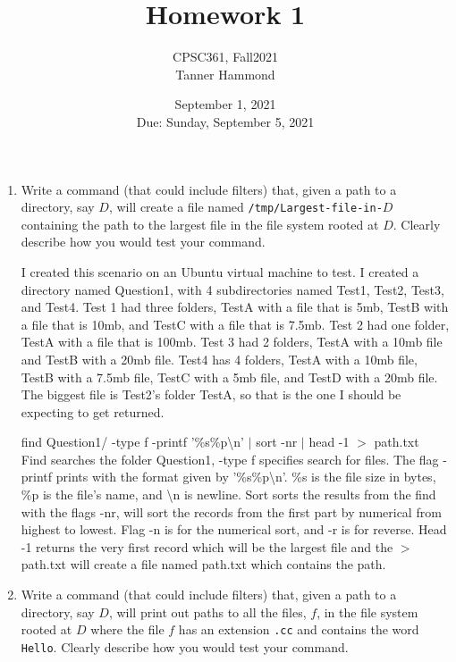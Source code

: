 \documentclass{article}
\title{Homework 1}
\author{CPSC361, Fall2021\\
        Tanner Hammond}
\date{September 1, 2021\\
Due: Sunday, September 5, 2021}
\begin{document}
\maketitle %

\begin{enumerate}

\item Write a command (that could include filters) that, given a path
  to a directory, say $D$, will create a file named
  \texttt{/tmp/Largest-file-in-$D$} containing the path to the largest
  file in the file system rooted at $D$. Clearly describe
  how you would test your command.
  
  I created this scenario on an Ubuntu virtual machine to test. I created a directory named Question1, with 4 subdirectories named Test1, Test2, Test3, and Test4. Test 1 had three folders, TestA with a file that is 5mb, TestB with a file that is 10mb, and TestC with a file that is 7.5mb. Test 2 had one folder, TestA with a file that is 100mb. Test 3 had 2 folders, TestA with a 10mb file and TestB with a 20mb file. Test4 has 4 folders, TestA with a 10mb file, TestB with a 7.5mb file, TestC with a 5mb file, and TestD with a 20mb file. The biggest file is Test2's folder TestA, so that is the one I should be expecting to get returned.
  
  find Question1/ -type f -printf '\%s\%p\textbackslash n' $|$ sort -nr $|$ head -1 $>$ path.txt\\
  Find searches the folder Question1, -type f specifies search for files. The flag -printf prints with the format given by '\%s\%p\textbackslash n'. \%s is the file size in bytes, \%p is the file's name, and \textbackslash n is newline. Sort sorts the results from the find with the flags -nr, will sort the records from the first part by numerical from highest to lowest. Flag -n is for the numerical sort, and -r is for reverse. Head -1 returns the very first record which will be the largest file and the $>$ path.txt will create a file named path.txt which contains the path.
  
\item Write a command (that could include filters) that, given a path
  to a directory, say $D$, will print out paths to all the files, $f$, in the
  file system rooted at $D$ where the file $f$ has an extension
  \texttt{.cc} and contains the word \texttt{Hello}. Clearly describe
  how you would test your command.
  

\end{enumerate}
\end{document}
